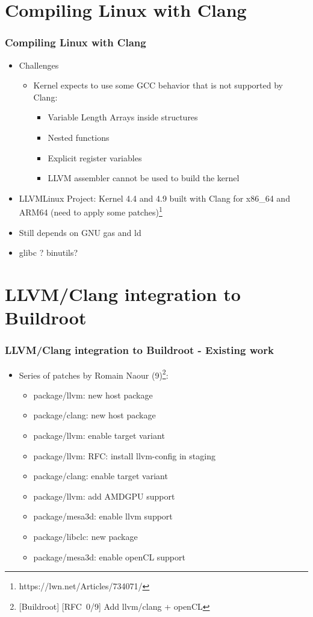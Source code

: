 \documentclass{beamer}
\begin{document}
\section{Compiling Linux with Clang}

\begin{frame}
\frametitle{Compiling Linux with Clang}
\begin{itemize}
  \item Challenges
  \begin{itemize}
    \item Kernel expects to use some GCC behavior that is not supported by Clang:
    \begin{itemize}
      \item Variable Length Arrays inside structures
      \item Nested functions
      \item Explicit register variables
      \item LLVM assembler cannot be used to build the kernel
    \end{itemize}
  \end{itemize}
  \item LLVMLinux Project: Kernel 4.4 and 4.9 built with Clang for x86\_64 and ARM64 (need to apply some patches)\footnote{https://lwn.net/Articles/734071/}
  \item Still depends on GNU {\selectfont gas} and {\selectfont ld}
  \item glibc ? binutils?
\end{itemize}
\end{frame}
\section{LLVM/Clang integration to Buildroot}

\begin{frame}
\frametitle{LLVM/Clang integration to Buildroot - Existing work}
\begin{itemize}
  \item Series of patches by Romain Naour (9)\footnote{[Buildroot] [RFC\ 0/9] Add llvm/clang + openCL}:
  \begin{itemize}
    \item package/llvm: new host package
    \item package/clang: new host package
    \item package/llvm: enable target variant
    \item package/llvm: RFC: install llvm-config in staging
    \item package/clang: enable target variant
    \item package/llvm: add AMDGPU support
    \item package/mesa3d: enable llvm support
    \item package/libclc: new package
    \item package/mesa3d: enable openCL support
  \end{itemize}
\end{itemize}
\end{frame}
\end{document}
